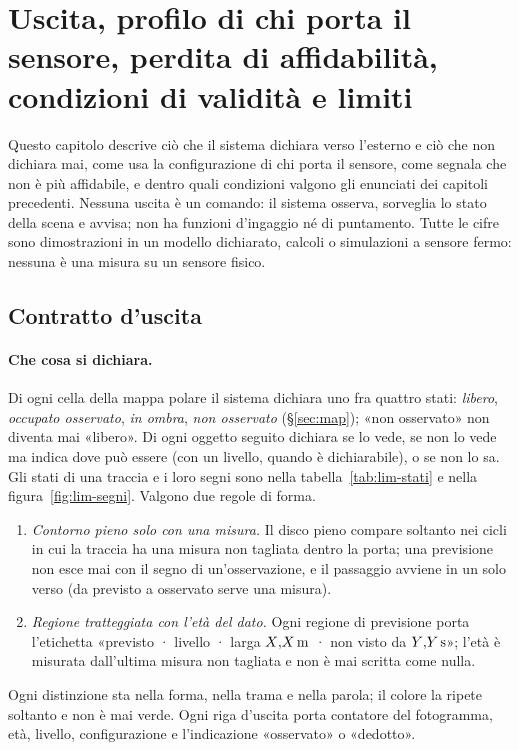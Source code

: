 \section{Uscita, profilo di chi porta il sensore, perdita di affidabilità, condizioni di validità e limiti}\label{sec:lim}

Questo capitolo descrive ciò che il sistema dichiara verso l'esterno e ciò che non dichiara mai, come usa la configurazione di chi porta il sensore, come segnala che non è più affidabile, e dentro quali condizioni valgono gli enunciati dei capitoli precedenti. Nessuna uscita è un comando: il sistema osserva, sorveglia lo stato della scena e avvisa; non ha funzioni d'ingaggio né di puntamento. Tutte le cifre sono dimostrazioni in un modello dichiarato, calcoli o simulazioni a sensore fermo: nessuna è una misura su un sensore fisico.

\subsection{Contratto d'uscita}\label{sec:lim-uscita}

\paragraph{Che cosa si dichiara.} Di ogni cella della mappa polare il sistema dichiara uno fra quattro stati: \emph{libero}, \emph{occupato osservato}, \emph{in ombra}, \emph{non osservato} (\S\ref{sec:map}); «non osservato» non diventa mai «libero». Di ogni oggetto seguito dichiara se lo vede, se non lo vede ma indica dove può essere (con un livello, quando è dichiarabile), o se non lo sa. Gli stati di una traccia e i loro segni sono nella tabella~\ref{tab:lim-stati} e nella figura~\ref{fig:lim-segni}. Valgono due regole di forma.
\begin{enumerate}[label=(\alph*)]
\item \emph{Contorno pieno solo con una misura.} Il disco pieno compare soltanto nei cicli in cui la traccia ha una misura non tagliata dentro la porta; una previsione non esce mai con il segno di un'osservazione, e il passaggio avviene in un solo verso (da previsto a osservato serve una misura).
\item \emph{Regione tratteggiata con l'età del dato.} Ogni regione di previsione porta l'etichetta «previsto · livello · larga $X{,}X\,\mathrm{m}$ · non visto da $Y{,}Y\,\mathrm{s}$»; l'età è misurata dall'ultima misura non tagliata e non è mai scritta come nulla.
\end{enumerate}
Ogni distinzione sta nella forma, nella trama e nella parola; il colore la ripete soltanto e non è mai verde. Ogni riga d'uscita porta contatore del fotogramma, età, livello, configurazione e l'indicazione «osservato» o «dedotto».

